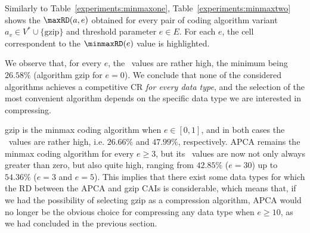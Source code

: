 \clearpage





Similarly to Table~\ref{experiments:minmaxone}, Table~\ref{experiments:minmaxtwo} shows the $\text{\maxRD}(a, e)$ obtained for every pair of coding algorithm variant $a_v \in V^* \cup \{\text{gzip}\}$ and threshold parameter $e \in E$. For each $e$, the cell correspondent to the $\text{\minmaxRD}(e)$ value is highlighted.


We observe that, for every $e$, the \minmaxRD\ values are rather high, the minimum being $26.58\%$ (algorithm gzip for $e=0$). We conclude that none of the considered algorithms achieves a competitive CR \textit{for every data type}, and the selection of the most convenient algorithm depends on the specific data type we are interested in compressing.


gzip is the minmax coding algorithm when $e \in [0, 1]$, and in both cases the \minmaxRD\ values are rather high, i.e. $26.66\%$ and $47.99\%$, respectively. APCA remains the minmax coding algorithm for every $e \geq 3$, but its \minmaxRD\ values are now not only always greater than zero, but also quite high, ranging from $42.85\%$ ($e=30$) up to $54.36\%$ ($e=3$ and $e=5$). This implies that there exist some data types for which the RD between the APCA and gzip CAIs is considerable, which means that, if we had the possibility of selecting gzip as a compression algorithm, APCA would no longer be the obvious choice for compressing any data type when $e \geq 10$, as we had concluded in the previous section. 


\clearpage




